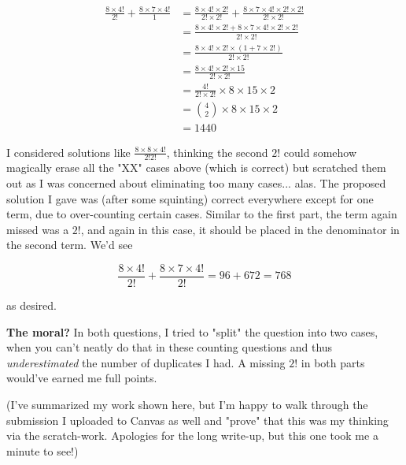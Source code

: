 \documentclass{article}
\begin{document}
\begin{equation}
	\begin{split}
		\frac{8\times4!}{2!} + \frac{8\times7\times4!}{1} & = \frac{8\times4!\times2!}{2!\times2!} + \frac{8\times7\times4!\times2!\times2!}{2!\times2!} \\
		& = \frac{8\times4!\times2! + 8\times7\times4!\times2!\times2!}{2!\times2!} \\
		& = \frac{8\times4!\times2!\times(1 + 7\times2!)}{2!\times2!} \\
		& = \frac{8\times4!\times2!\times15}{2!\times2!} \\
		& = \frac{4!}{2!\times2!} \times 8\times15\times2 \\
		& = \binom{4}{2} \times 8\times15\times2 \\
		& = 1440
	\end{split}
\end{equation}

I considered solutions like $\frac{8\times8\times4!}{2!2!}$, thinking the second $2!$ could somehow magically erase all the "XX" cases above (which is correct) but scratched them out as I was concerned about eliminating too many cases... alas. The proposed solution I gave was (after some squinting) correct everywhere except for one term, due to over-counting certain cases. Similar to the first part, the term again missed was a $2!$, and again in this case, it should be placed in the denominator in the second term. We'd see

$$\frac{8\times4!}{2!} + \frac{8\times7\times4!}{2!} = 96 + 672 = 768$$

as desired.

\vspace{3mm}
\textbf{The moral?} In both questions, I tried to "split" the question into two cases, when you can't neatly do that in these counting questions and thus \textit{underestimated} the number of duplicates I had. A missing $2!$ in both parts would've earned me full points.

(I've summarized my work shown here, but I'm happy to walk through the submission I uploaded to Canvas as well and "prove" that this was my thinking via the scratch-work. Apologies for the long write-up, but this one took me a minute to see!)
\end{document}
